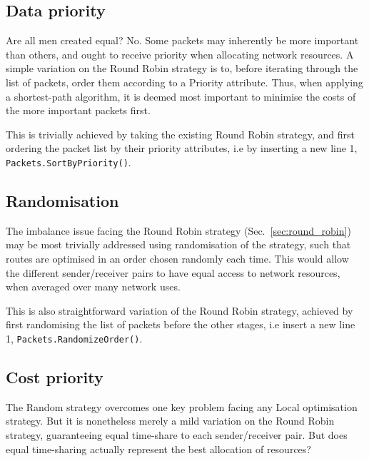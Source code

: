 \documentclass[aps,rmp,twocolumn,amsmath,amssymb,nofootinbib,superscriptaddress]{revtex4}
\begin{document}
%
%

\subsection{Data priority} \label{sec:data_priority}

Are all men created equal? No. Some packets may inherently be more important than others, and ought to receive priority when allocating network resources. A simple variation on the {\sc Round Robin} strategy is to, before iterating through the list of packets, order them according to a {\sc Priority} attribute. Thus, when applying a shortest-path algorithm, it is deemed most important to minimise the costs of the more important packets first.

This is trivially achieved by taking the existing {\sc Round Robin} strategy, and first ordering the packet list by their priority attributes, i.e by inserting a new line 1, \mbox{\tt Packets.SortByPriority()}.

%
%

\subsection{Randomisation} \label{sec:random}

The imbalance issue facing the {\sc Round Robin} strategy (Sec.~\ref{sec:round_robin}) may be most trivially addressed using randomisation of the strategy, such that routes are optimised in an order chosen randomly each time. This would allow the different sender/receiver pairs to have equal access to network resources, when averaged over many network uses.

This is also straightforward variation of the {\sc Round Robin} strategy, achieved by first randomising the list of packets before the other stages, i.e insert a new line 1, \mbox{\tt Packets.RandomizeOrder()}.

%
%

\subsection{Cost priority} \label{sec:cost_priority}

The {\sc Random} strategy overcomes one key problem facing any {\sc Local} optimisation strategy. But it is nonetheless merely a mild variation on the {\sc Round Robin} strategy, guaranteeing equal time-share to each sender/receiver pair. But does equal time-sharing actually represent the best allocation of resources?
\end{document}
